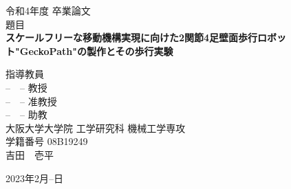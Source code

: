 
\begin{titlepage}
  \centering

{\Large 令和4年度 卒業論文} 
\vspace{1cm} \\
 {\Large 題目} \\
{\huge \textbf{スケールフリーな移動機構実現に向けた2関節4足壁面歩行ロボット"GeckoPath"の製作とその歩行実験}}\\ 
\vspace{5cm}

  

指導教員 \vspace{0.1cm} \\
{\Large --　-- 教授} \\
{\Large --　-- 准教授} \\
{\Large --　-- 助教} \\
\vspace{1cm}
{\Large 大阪大学大学院 工学研究科 機械工学専攻}\\
  {\Large 学籍番号 08B19249} 
  \vspace{0.5cm} \\
  {\LARGE 吉田　壱平}
\vspace{2.5cm}
  
 
  \vfill
  

    {\Large 2023年2月--日}

   
  \vfill
  
 
   
  \end{titlepage}